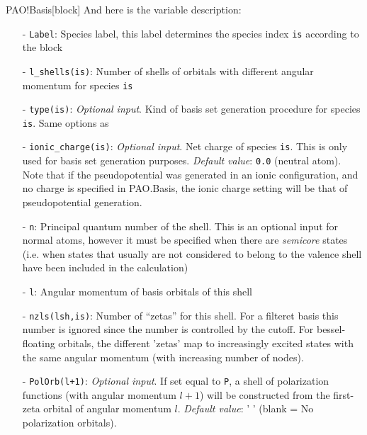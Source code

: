 \begin{fdfentry}{PAO!Basis}[block]
  \noindent
  And here is the variable description:
  \begin{itemize}
    \item[-] %
    \texttt{Label}: Species label, this label determines
    the species index \texttt{is} according to the block

    \item[-]%
    \texttt{l\_shells(is)}: Number of shells of orbitals
    with different angular momentum for species \texttt{is}

    \item[-]%
    \texttt{type(is)}: \textit{Optional input}.  Kind of basis set
    generation procedure for species \texttt{is}.  Same options as

    \item[-]%
    \texttt{ionic\_charge(is)}: \textit{Optional input}.  Net charge
    of species \texttt{is}. This is only used for basis set generation
    purposes. \textit{Default value}: \texttt{0.0} (neutral
    atom). Note that if the pseudopotential was generated in an ionic
    configuration, and no charge is specified in PAO.Basis, the ionic
    charge setting will be that of pseudopotential generation.

    \item[-]%
    \texttt{n}: Principal quantum number of the shell. This is an
    optional input for normal atoms, however it must be specified when
    there are \textit{semicore} states (i.e. when states that usually
    are not considered to belong to the valence shell have been
    included in the calculation)

    \item[-]%
    \texttt{l}: Angular momentum of basis orbitals of this shell

    \item[-]%
    \texttt{nzls(lsh,is)}: Number of ``zetas'' for this shell. For a
    filteret basis this number is ignored since the number is
    controlled by the cutoff.
    For bessel-floating orbitals, the different 'zetas' map to
    increasingly excited states with the same angular momentum (with
    increasing number of nodes).
    

    \item[-]%
    \texttt{PolOrb(l+1)}: \textit{Optional input}. If set equal to
    \texttt{P}, a shell of polarization functions (with angular
    momentum $l+1$) will be constructed from the first-zeta orbital of
    angular momentum $l$. \textit{Default value}: ' ' (blank = No
    polarization orbitals).


\end{itemize}
\end{fdfentry}
